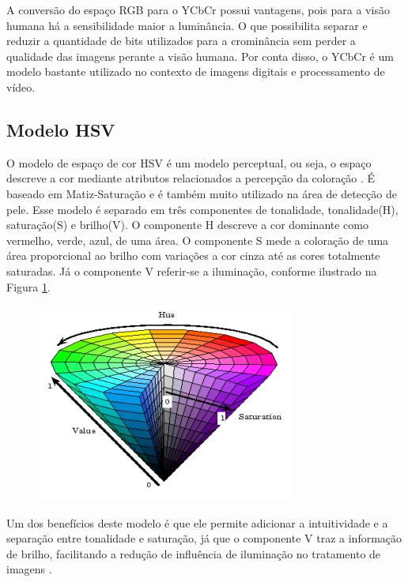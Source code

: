 A conversão do espaço RGB para o YCbCr possui vantagens, pois para a visão humana há a sensibilidade maior a luminância. O que possibilita separar e reduzir a quantidade de bits utilizados para a crominância sem perder a qualidade das imagens perante a visão humana. Por conta disso, o YCbCr é um modelo bastante utilizado no contexto de imagens digitais e processamento de vídeo.
 
\subsection{Modelo HSV}
O modelo de espaço de cor HSV é um modelo perceptual, ou seja, o espaço descreve a cor mediante atributos relacionados a percepção da coloração \cite{Deteccao_de_pele_humana_em_imagens_veiculadas_na_web}. É baseado em Matiz-Saturação e é também muito utilizado na área de detecção de pele. Esse modelo é separado em três componentes de tonalidade, tonalidade(H), saturação(S) e brilho(V). O componente H descreve a cor dominante como vermelho, verde, azul, de uma área. O componente S mede a coloração de uma área proporcional ao brilho com variações a cor cinza até as cores totalmente saturadas. Já o componente V referir-se a iluminação, conforme ilustrado na Figura \ref{fig: hsv}.

 \begin{figure}[h]
\caption{}
\centering

\includegraphics[]{Template_Latex_TCC-UNIFTEC/_lib/imagens/HSV.png}

\label{fig: hsv}
\end{figure}

 Um dos benefícios deste modelo é que ele permite adicionar a intuitividade e a separação entre tonalidade e saturação, já que o componente V traz a informação de brilho, facilitando a redução de influência de iluminação no tratamento de imagens \cite{Skin_detection_ashort_tutorial}.
 
